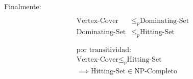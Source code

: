 Finalmente:
$$
\begin{array}{}
\begin{split} \\
\text{Vertex-Cover}  & \leq _{p} \text{Dominating-Set} \\
\text{Dominating-Set}  & \leq _{p} \text{Hitting-Set} \\
\end{split} \\
\begin{array}{}
\text{por transitividad:} \\
\text{Vertex-Cover}  \leq _{p} \text{Hitting-Set} \\
\implies \text{Hitting-Set} \in \text{NP-Completo}
\end{array}
\end{array}
$$